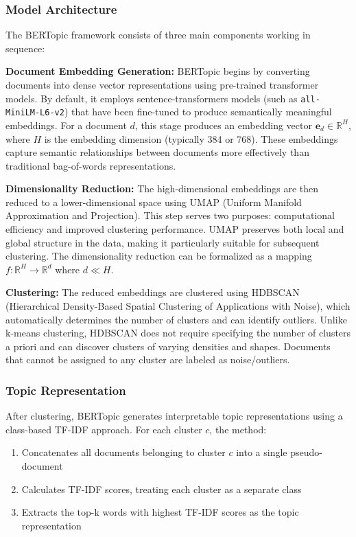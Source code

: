 \documentclass[12pt]{article}
\begin{document}
\subsubsection{Model Architecture}
The BERTopic framework consists of three main components working in sequence:

\textbf{Document Embedding Generation:} BERTopic begins by converting documents into dense vector representations using pre-trained transformer models. By default, it employs sentence-transformers models (such as \texttt{all-MiniLM-L6-v2}) that have been fine-tuned to produce semantically meaningful embeddings. For a document $d$, this stage produces an embedding vector $\mathbf{e}_d \in \mathbb{R}^{H}$, where $H$ is the embedding dimension (typically 384 or 768). These embeddings capture semantic relationships between documents more effectively than traditional bag-of-words representations.

\textbf{Dimensionality Reduction:} The high-dimensional embeddings are then reduced to a lower-dimensional space using UMAP (Uniform Manifold Approximation and Projection). This step serves two purposes: computational efficiency and improved clustering performance. UMAP preserves both local and global structure in the data, making it particularly suitable for subsequent clustering. The dimensionality reduction can be formalized as a mapping $f: \mathbb{R}^{H} \rightarrow \mathbb{R}^{d}$ where $d \ll H$.

\textbf{Clustering:} The reduced embeddings are clustered using HDBSCAN (Hierarchical Density-Based Spatial Clustering of Applications with Noise), which automatically determines the number of clusters and can identify outliers. Unlike k-means clustering, HDBSCAN does not require specifying the number of clusters a priori and can discover clusters of varying densities and shapes. Documents that cannot be assigned to any cluster are labeled as noise/outliers.

\subsubsection{Topic Representation}
After clustering, BERTopic generates interpretable topic representations using
a class-based TF-IDF approach. For each cluster $c$, the method:

\begin{enumerate}
    \item Concatenates all documents belonging to cluster $c$ into a single
          pseudo-document
    \item Calculates TF-IDF scores, treating each cluster as a separate class
    \item Extracts the top-k words with highest TF-IDF scores as the topic representation
\end{enumerate}
\end{document}
